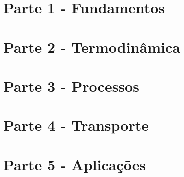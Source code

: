 \documentclass[12pt,fleqn]{book}
\begin{document}
\maketitle
\makecopyright

\usechapterimagefalse

\pagestyle{fancy}


\pagestyle{empty}

\tableofcontents
\cleardoublepage

\pagestyle{fancy}



\part{Parte 1 - Fundamentos}







\part{\label{part:thermo}Parte 2 - Termodinâmica}







\part{\label{part:process}Parte 3 - Processos}







\part{\label{part:transport}Parte 4 - Transporte}







\part{\label{part:applications}Parte 5 - Aplicações}
\end{document}
